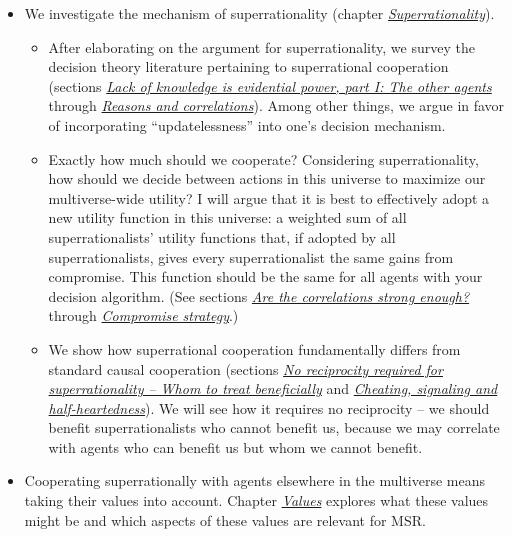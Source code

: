 \begin{itemize}
\item
  We investigate the mechanism of superrationality (chapter
  \protect\hyperlink{superrationality}{\emph{Superrationality}}).

  \begin{itemize}
  \item
    After elaborating on the argument for superrationality, we survey
    the decision theory literature pertaining to superrational
    cooperation (sections
    \protect\hyperlink{lack-of-knowledge-is-evidential-power-part-i-the-other-agents}{\emph{Lack
    of knowledge is evidential power, part I: The other agents}}
    through \protect\hyperlink{reasons-and-correlations}{\emph{Reasons
    and correlations}}). Among other things, we argue in favor of
    incorporating ``updatelessness'' into one's decision mechanism.
  \item
    Exactly how much should we cooperate? Considering superrationality,
    how should we decide between actions in this universe to maximize
    our multiverse-wide utility? I will argue that it is best to
    effectively adopt a new utility function in this universe: a
    weighted sum of all superrationalists' utility functions that, if
    adopted by all superrationalists, gives every superrationalist the
    same gains from compromise. This function should be the same for all
    agents with your decision algorithm. (See sections
    \protect\hyperlink{are-the-correlations-strong-enough}{\emph{Are
    the correlations strong enough?}} through
    \protect\hyperlink{compromise-strategy}{\emph{Compromise
    strategy}}.)
  \item
    We show how superrational cooperation fundamentally differs from
    standard causal cooperation (sections
    \protect\hyperlink{no-reciprocity-needed-whom-to-treat-beneficially}{\emph{No
    reciprocity required for superrationality -- Whom to treat
    beneficially}} and
    \protect\hyperlink{cheating-signaling-and-half-heartedness}{\emph{Cheating,
    signaling and half-heartedness}}). We will see how it requires no
    reciprocity -- we should benefit superrationalists who cannot
    benefit us, because we may correlate with agents who can benefit us
    but whom we cannot benefit.
  \end{itemize}
\item
  Cooperating superrationally with agents elsewhere in the multiverse
  means taking their values into account. Chapter
  \protect\hyperlink{values}{\emph{Values}} explores what these
  values might be and which aspects of these values are relevant for
  MSR.


\end{itemize}

